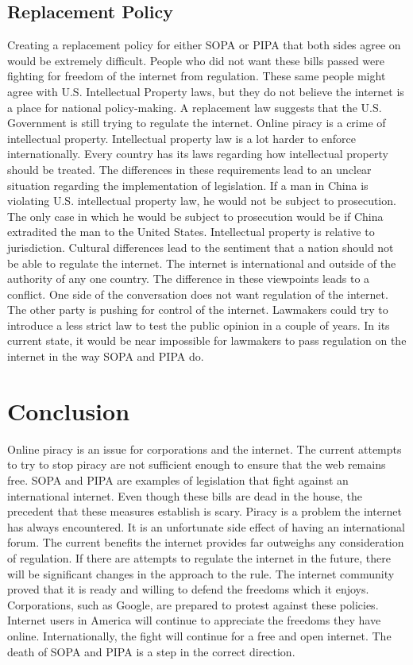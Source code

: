 \documentclass[11pt,journal,compsoc]{IEEEtran}
\begin{document}
\subsection{Replacement Policy}
Creating a replacement policy for either SOPA or PIPA that both sides agree on would be extremely difficult. People who did not want these bills passed were fighting for freedom of the internet from regulation. These same people might agree with U.S. Intellectual Property laws, but they do not believe the internet is a place for national policy-making. A replacement law suggests that the U.S. Government is still trying to regulate the internet. 
\indent Online piracy is a crime of intellectual property. Intellectual property law is a lot harder to enforce internationally. Every country has its laws regarding how intellectual property should be treated. The differences in these requirements lead to an unclear situation regarding the implementation of legislation. If a man in China is violating U.S. intellectual property law, he would not be subject to prosecution. The only case in which he would be subject to prosecution would be if China extradited the man to the United States. Intellectual property is relative to jurisdiction. Cultural differences lead to the sentiment that a nation should not be able to regulate the internet. The internet is international and outside of the authority of any one country. 
\indent The difference in these viewpoints leads to a conflict. One side of the conversation does not want regulation of the internet. The other party is pushing for control of the internet. Lawmakers could try to introduce a less strict law to test the public opinion in a couple of years. In its current state, it would be near impossible for lawmakers to pass regulation on the internet in the way SOPA and PIPA do. 


\section{Conclusion}
Online piracy is an issue for corporations and the internet. The current attempts to try to stop piracy are not sufficient enough to ensure that the web remains free. SOPA and PIPA are examples of legislation that fight against an international internet. Even though these bills are dead in the house, the precedent that these measures establish is scary. Piracy is a problem the internet has always encountered. It is an unfortunate side effect of having an international forum. The current benefits the internet provides far outweighs any consideration of regulation.  If there are attempts to regulate the internet in the future, there will be significant changes in the approach to the rule. The internet community proved that it is ready and willing to defend the freedoms which it enjoys. Corporations, such as Google, are prepared to protest against these policies. Internet users in America will continue to appreciate the freedoms they have online. Internationally, the fight will continue for a free and open internet. The death of SOPA and PIPA is a step in the correct direction.
\end{document}

